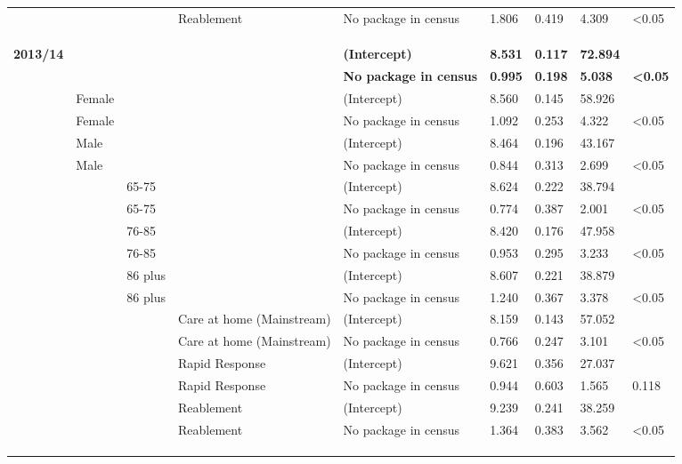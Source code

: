 \documentclass[]{article}
\begin{document}
\begin{landscape}
\begin{longtable}[c]{@{}lllllllll@{}}
 &  &  & Reablement & No package in census & 1.806 & 0.419 & 4.309 & \textless{}0.05 \\
 \\
 \\
 \\
\textbf{2013/14} & \textbf{} & \textbf{} & \textbf{} & \textbf{(Intercept)} & \textbf{8.531} & \textbf{0.117} & \textbf{72.894} & \textbf{} \\
\textbf{} & \textbf{} & \textbf{} & \textbf{} & \textbf{No package in census} & \textbf{0.995} & \textbf{0.198} & \textbf{5.038} & \textbf{\textless{}0.05} \\
 & Female &  &  & (Intercept) & 8.560 & 0.145 & 58.926 &  \\
 & Female &  &  & No package in census & 1.092 & 0.253 & 4.322 & \textless{}0.05 \\
 & Male &  &  & (Intercept) & 8.464 & 0.196 & 43.167 &  \\
 & Male &  &  & No package in census & 0.844 & 0.313 & 2.699 & \textless{}0.05 \\
 &  & 65-75 &  & (Intercept) & 8.624 & 0.222 & 38.794 &  \\
 &  & 65-75 &  & No package in census & 0.774 & 0.387 & 2.001 & \textless{}0.05 \\
 &  & 76-85 &  & (Intercept) & 8.420 & 0.176 & 47.958 &  \\
 &  & 76-85 &  & No package in census & 0.953 & 0.295 & 3.233 & \textless{}0.05 \\
 &  & 86 plus &  & (Intercept) & 8.607 & 0.221 & 38.879 &  \\
 &  & 86 plus &  & No package in census & 1.240 & 0.367 & 3.378 & \textless{}0.05 \\
 &  &  & Care at home (Mainstream) & (Intercept) & 8.159 & 0.143 & 57.052 &  \\
 &  &  & Care at home (Mainstream) & No package in census & 0.766 & 0.247 & 3.101 & \textless{}0.05 \\
 &  &  & Rapid Response & (Intercept) & 9.621 & 0.356 & 27.037 &  \\
 &  &  & Rapid Response & No package in census & 0.944 & 0.603 & 1.565 & 0.118 \\
 &  &  & Reablement & (Intercept) & 9.239 & 0.241 & 38.259 &  \\
 &  &  & Reablement & No package in census & 1.364 & 0.383 & 3.562 & \textless{}0.05 \\
 \\
 \\
 \\

\end{longtable}
\end{landscape}
\end{document}

